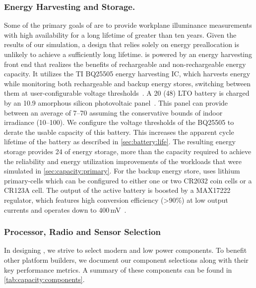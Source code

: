\subsubsection{Energy Harvesting and Storage.}
Some of the primary goals of \name are to provide workplane illuminance measurements with high availability for a long lifetime of greater than ten years. 
Given the results of our simulation, a design that relies solely on energy preallocation is unlikely to achieve a sufficiently long lifetime. 
\name is powered by an energy harvesting front end that realizes the benefits
of rechargeable and non-rechargeable energy capacity. 
It utilizes the TI BQ25505 energy harvesting IC, which
harvests energy while monitoring both
rechargeable and backup energy stores,
switching between them at user-configurable voltage thresholds~\cite{bq25505}. A
20\ssi{\milli\Ah} (48\ssi{\milli\Wh}) LTO battery is charged by an 10.9\ssi{\centi\meter\squared} amorphous
silicon photovoltaic panel~\cite{LTODatasheet, LTODatasheet2}. 
This panel can provide between an average of 7--70\ssi{\micro\watt} assuming the conservative bounds of indoor irradiance (10--100\ssi[per-mode=symbol]{\micro\watt\per\centi\meter\squared}). 
We configure the voltage thresholds of the BQ25505 to derate the 
usable capacity of this battery. This 
increases the apparent cycle lifetime of the battery as described in \cref{sec:battery:life}.
The resulting energy storage provides 24\ssi{\milli\Wh} of
energy storage, more than the capacity required to achieve the reliability and energy utilization
improvements of the workloads that were simulated in \cref{sec:capacity:primary}. 
For the backup energy
store, \name uses lithium primary-cells which can be configured to either one or two CR2032 coin
cells or a CR123A cell.
The output of the active battery
is boosted by a MAX17222 regulator, which features high conversion efficiency
(>90\%) at low output currents and operates down to 400\,mV~\cite{max17222}.

\subsubsection{Processor, Radio and Sensor Selection}
In designing \name, we strive to select modern and low power components.
To benefit other
platform builders, we document our component selections
along with their key performance metrics. A summary of these
components can be found in \cref{tab:capacity:components}.

